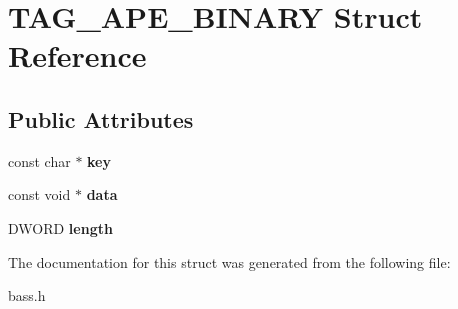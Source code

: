 \hypertarget{structTAG__APE__BINARY}{}\section{T\+A\+G\+\_\+\+A\+P\+E\+\_\+\+B\+I\+N\+A\+R\+Y Struct Reference}
\label{structTAG__APE__BINARY}
\subsection*{Public Attributes}
\begin{DoxyCompactItemize}
\item 
\hypertarget{structTAG__APE__BINARY_a2bb8b34beb262c21c79fe9b3dd935e6e}{}const char $\ast$ {\bfseries key}\label{structTAG__APE__BINARY_a2bb8b34beb262c21c79fe9b3dd935e6e}

\item 
\hypertarget{structTAG__APE__BINARY_a5ce86f75cb101a224885cb6d083e717a}{}const void $\ast$ {\bfseries data}\label{structTAG__APE__BINARY_a5ce86f75cb101a224885cb6d083e717a}

\item 
\hypertarget{structTAG__APE__BINARY_a7e3623a188e60d152fb9cdcd7a8f9668}{}D\+W\+O\+R\+D {\bfseries length}\label{structTAG__APE__BINARY_a7e3623a188e60d152fb9cdcd7a8f9668}

\end{DoxyCompactItemize}


The documentation for this struct was generated from the following file\+:\begin{DoxyCompactItemize}
\item 
bass.\+h\end{DoxyCompactItemize}
